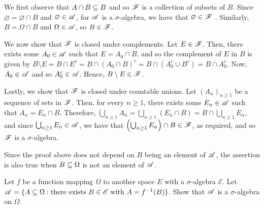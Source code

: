 \begin{solution}
    We first observe that $A \cap B \subseteq B$ and so $\mathscr{F}$ is a collection of subsets of $B$. Since $\varnothing = \varnothing \cap B$ and $\varnothing \in \mathscr{A}$, for $\mathscr{A}$ is a $\sigma$-algebra, we have that $\varnothing \in \mathscr{F}$ . Similarly, $B = \Omega \cap B$ and $\Omega \in \mathscr{A}$, so $B \in \mathscr{F}$.
    
    We now show that $\mathscr{F}$ is closed under complements. Let $E \in \mathscr{F}$. Then, there exists some $A_0 \in \mathscr{A}$ such that $E = A_0 \cap B$, and so the complement of $E$ in $B$ is given by $B \setminus E = B \cap E^c = B \cap (A_0 \cap B)^c = B \cap (A_0^c \cup B^c) = B \cap A_0^c$. Now, $A_0 \in \mathscr{A}$ and so $A_0^c \in \mathscr{A}$. Hence, $B \setminus E \in \mathscr{F}$.
    
    Lastly, we show that $\mathscr{F}$ is closed under countable unions. Let $(A_n)_{n \geq 1}$ be a sequence of sets in $\mathscr{F}$. Then, for every $n \geq 1$, there exists some $E_n \in \mathscr{A}$ such that $A_n = E_n \cap B$. Therefore, $\bigcup_{n \geq 1} A_n = \bigcup_{n \geq 1} (E_n \cap B) = B \cap \bigcup_{n \geq 1} E_n$, and since $\bigcup_{n \geq 1} E_n \in \mathscr{A}$, we have that $\left( \bigcup_{n \geq 1} E_n \right) \cap B \in \mathscr{F}$, as required, and so $\mathscr{F}$ is a $\sigma$-algebra. 

    Since the proof above does not depend on $B$ being an element of $\mathscr{A}$, the assertion is also true when $B \subseteq \Omega$ is not an element of $\mathscr{A}$.
\end{solution}


\begin{problem}
    Let $f$ be a function mapping $\Omega$ to another space $E$ with a $\sigma$-algebra $\mathscr{E}$. Let $\mathscr{A} = \{ A \subseteq \Omega: \text{there exists $B \in \mathscr{E}$ with $A = f^{-1}(B)$} \}$. Show that $\mathscr{A}$ is a $\sigma$-algebra on $\Omega$.
\end{problem}

